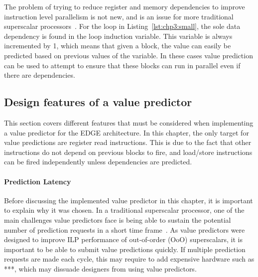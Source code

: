 The problem of trying to reduce register and memory dependencies to improve instruction level parallelism is not new, and is an issue for more traditional superscalar processors~\cite{peraisVTAGE2014}.
For the loop in Listing~\ref{lst:chp3:small}, the sole data dependency is found in the loop induction variable.
This variable is always incremented by 1, which means that given a block, the value can easily be predicted based on previous values of the variable.
In these cases value prediction can be used to attempt to ensure that these blocks can run in parallel even if there are dependencies.


\subsection{Design features of a value predictor}

This section covers different features that must be considered when implementing a value predictor for the EDGE architecture.
In this chapter, the only target for value predictions are register read instructions.
This is due to the fact that other instructions do not depend on previous blocks to fire, and load/store instructions can be fired independently unless dependencies are predicted.

\paragraph*{Prediction Latency} Before discussing the implemented value predictor in this chapter, it is important to explain why it was chosen.
In a traditional superscalar processor, one of the main challenges value predictors face is being able to sustain the potential number of prediction requests in a short time frame~\cite{peraisBeBop2015}.
As value predictors were designed to improve ILP performance of out-of-order (OoO) superscalars, it is important to be able to submit value predictions quickly.
If multiple prediction requests are made each cycle, this may require to add expensive hardware such as ***, which may dissuade designers from using value predictors.

